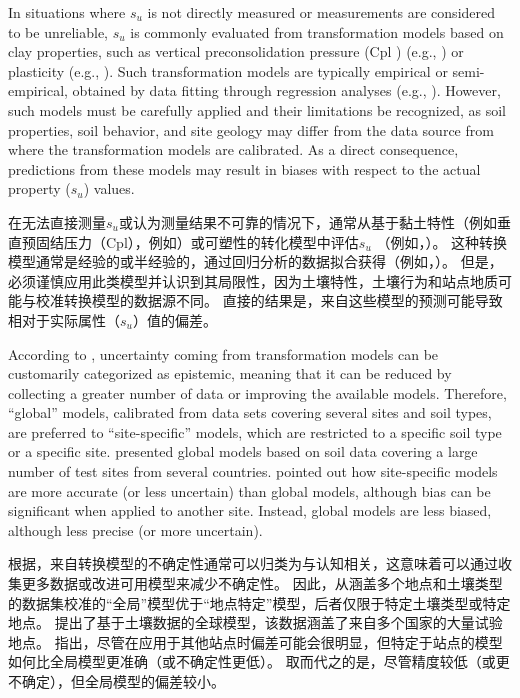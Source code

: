 \begin{ParaColumn}
    \switchcolumn*

    In situations where $s_u$ is not directly measured or measurements are considered to be unreliable, $s_u$ is commonly evaluated from transformation  models  based  on  clay  properties,  such  as vertical preconsolidation pressure (Cpl ) (e.g., \citealt{Mesri1975409,Jamiolkowski198557}) or plasticity (e.g., \citealt{Hansbo1957,Chandler198813}). Such transformation models are typically empirical or semi-empirical, obtained by data ﬁtting through regression analyses (e.g., \citealt{Kulhawy1990}). However, such models must be carefully applied and their limitations be recognized, as soil properties, soil behavior, and site geology may differ from the data source from where the transformation models are calibrated. As a direct consequence, predictions from these models may result in biases with respect to the actual property ($s_u$) values.

    \switchcolumn

    在无法直接测量$s_u$或认为测量结果不可靠的情况下，通常从基于黏土特性（例如垂直预固结压力（Cpl），例如\citealt{Mesri1975409,Jamiolkowski198557}）或可塑性的转化模型中评估$s_u$ （例如，\citealt{Hansbo1957,Chandler198813}）。 这种转换模型通常是经验的或半经验的，通过回归分析的数据拟合获得（例如，\citealt{Kulhawy1990}）。 但是，必须谨慎应用此类模型并认识到其局限性，因为土壤特性，土壤行为和站点地质可能与校准转换模型的数据源不同。 直接的结果是，来自这些模型的预测可能导致相对于实际属性（$s_u$）值的偏差。

    \switchcolumn*

    According to \citet{Phoon1999612}, uncertainty coming from transformation models can be customarily categorized as epistemic, meaning that it can be reduced by collecting a greater number of data or improving the available models. Therefore, “global” models, calibrated from data sets covering several sites and soil types, are preferred to “site-speciﬁc” models, which are restricted to a speciﬁc soil type or a speciﬁc site. \citet{Ching201252, Ching2012522, Ching2014663, Ching2014686} presented global models based on soil data covering a large number of test sites from several countries. \citet{Ching201252} pointed out how site-speciﬁc models are more accurate (or less uncertain) than global models, although bias can be signiﬁcant when applied to another site. Instead, global models are less biased, although less precise (or more uncertain).

    \switchcolumn

    根据\citet{Phoon1999612}，来自转换模型的不确定性通常可以归类为与认知相关，这意味着可以通过收集更多数据或改进可用模型来减少不确定性。 因此，从涵盖多个地点和土壤类型的数据集校准的“全局”模型优于“地点特定”模型，后者仅限于特定土壤类型或特定地点。 \citet{Ching201252, Ching2012522, Ching2014663, Ching2014686}提出了基于土壤数据的全球模型，该数据涵盖了来自多个国家的大量试验地点。 \citet{Ching201252}指出，尽管在应用于其他站点时偏差可能会很明显，但特定于站点的模型如何比全局模型更准确（或不确定性更低）。 取而代之的是，尽管精度较低（或更不确定），但全局模型的偏差较小。


\end{ParaColumn}

